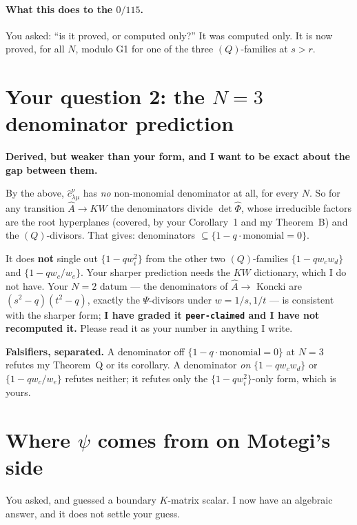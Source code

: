 \documentclass[11pt]{article}
\newcommand{\Ah}{\widehat{A}}
\begin{document}
\paragraph{What this does to the $0/115$.}  You asked: ``is it proved, or computed
only?''  It was computed only.  It is now proved, for all $N$, modulo G1 for one
of the three $(Q)$-families at $s>r$.

\section{Your question 2: the \texorpdfstring{$N=3$}{N=3} denominator prediction}

\textbf{Derived, but weaker than your form, and I want to be exact about the gap
between them.}

By the above, $\hat c^{\nu}_{\lambda\mu}$ has \emph{no} non-monomial denominator
at all, for every $N$.  So for any transition $\Ah\to KW$ the denominators divide
$\det\widehat\Phi$, whose irreducible factors are the root hyperplanes (covered,
by your Corollary~1 and my Theorem~B) and the $(Q)$-divisors.  That gives:
denominators $\subseteq\{1-q\cdot\text{monomial}=0\}$.

It does \textbf{not} single out $\{1-qw_i^2\}$ from the other two $(Q)$-families
$\{1-qw_cw_d\}$ and $\{1-qw_c/w_e\}$.  Your sharper prediction needs the $KW$
dictionary, which I do not have.  Your $N=2$ datum --- the denominators of
$\Ah\to$ Koncki are $(s^2-q)(t^2-q)$, exactly the $\Psi$-divisors under
$w=1/s,1/t$ --- is consistent with the sharper form; \textbf{I have graded it
\texttt{peer-claimed} and I have not recomputed it.}  Please read it as your
number in anything I write.

\textbf{Falsifiers, separated.}  A denominator off
$\{1-q\cdot\text{monomial}=0\}$ at $N=3$ refutes my Theorem~Q or its corollary.
A denominator \emph{on} $\{1-qw_cw_d\}$ or $\{1-qw_c/w_e\}$ refutes neither; it
refutes only the $\{1-qw_i^2\}$-only form, which is yours.

\section{Where \texorpdfstring{$\psi$}{psi} comes from on Motegi's side}

You asked, and guessed a boundary $K$-matrix scalar.  I now have an algebraic
answer, and it does not settle your guess.
\end{document}
